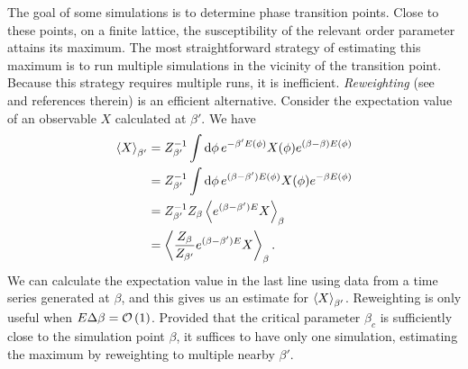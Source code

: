 The goal of some simulations is to determine phase transition points. 
Close to these points, on a finite lattice, the susceptibility of the 
relevant order parameter attains its maximum. The most straightforward 
strategy of estimating this maximum is to run multiple simulations 
in the vicinity of the transition point. Because this strategy 
requires multiple runs, it is inefficient. 
{\it Reweighting} (see~\cite{ferrenberg_new_1989} and
references therein) is an efficient alternative. Consider
the expectation value of an observable $X$ calculated at $\beta'$. We have
\begin{equation}\label{eq:RW}
\begin{aligned}
  \ev{X}_{\beta'}&=Z_{\beta'}^{-1}\int\dd{\phi}e^{-\beta'E(\phi)}X(\phi)
                  e^{(\beta-\beta)E(\phi)}\\
                 &=Z_{\beta'}^{-1}\int\dd{\phi}e^{(\beta-\beta')E(\phi)}
                  X(\phi)e^{-\beta E(\phi)}\\
                 &=Z_{\beta'}^{-1}Z_{\beta}\ev{e^{(\beta-\beta')E}X}_\beta\\
                 &=\ev{\frac{Z_\beta}{Z_{\beta'}}e^{(\beta-\beta')E}X}_\beta.
\end{aligned}
\end{equation}
We can calculate the expectation value in the last line
using data from a time series generated at $\beta$, and this gives us an
estimate for $\ev{X}_{\beta'}$. Reweighting is only useful when
$E\Delta\beta=\operatorname{\mathcal{O}}\left(1\right)$. Provided that the critical parameter $\beta_c$
is sufficiently close to the simulation point $\beta$, it suffices
to have only one simulation, estimating the maximum by reweighting to
multiple nearby $\beta'$.




